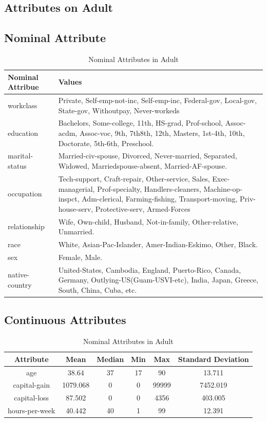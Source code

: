 \documentclass[letterpaper,12pt]{article}
\begin{document}
\begin{appendices}
\section{Attributes on Adult}
\subsection{Nominal Attribute}
\begin{table}[ht]
\centering
\begin{tabular}{|l|p{9cm}|} %
\hline 
Nominal Attribue & Values\\
\hline 
workclass & Private, Self-emp-not-inc, Self-emp-inc, Federal-gov, Local-gov, State-gov, Withoutpay, Never-workeds \\
\hline 
education & Bachelors, Some-college, 11th, HS-grad, Prof-school, Assoc-acdm, Assoc-voc, 9th, 7th8th, 12th, Masters, 1st-4th, 10th, Doctorate, 5th-6th, Preschool. \\
\hline
marital-status & Married-civ-spouse, Divorced, Never-married, Separated, Widowed, Marriedspouse-absent, Married-AF-spouse. \\
\hline
occupation & Tech-support, Craft-repair, Other-service, Sales, Exec-managerial, Prof-specialty, Handlers-cleaners, Machine-op-inspct, Adm-clerical, Farming-fishing, Transport-moving, Priv-house-serv, Protective-serv, Armed-Forces \\
\hline
relationship & Wife, Own-child, Husband, Not-in-family, Other-relative, Unmarried. \\
\hline
race & White, Asian-Pac-Islander, Amer-Indian-Eskimo, Other, Black. \\
\hline
sex & Female, Male. \\
\hline
native-country & United-States, Cambodia, England, Puerto-Rico, Canada, Germany, Outlying-US(Guam-USVI-etc), India, Japan, Greece, South, China, Cuba, etc.\\
\hline
\end{tabular}
\caption{Nominal Attributes in Adult}
\end{table}
\newpage

\subsection{Continuous Attributes}
\begin{table}[hbpt]
\centering
\begin{tabular}{|c|c|c|c|c|c|} %
\hline 
Attribute & Mean & Median & Min & Max & Standard Deviation\\
\hline 
age & 38.64 & 37 & 17 & 90 & 13.711 \\
\hline
capital-gain &  1079.068 & 0 & 0 & 99999 & 7452.019\\ 
\hline
capital-loss & 87.502 & 0 & 0 & 4356 & 403.005 \\ 
\hline
hours-per-week & 40.442 & 40 & 1 & 99 & 12.391 \\
\hline
\end{tabular}
\caption{Nominal Attributes in Adult}
\end{table}


\end{appendices}
\end{document}
